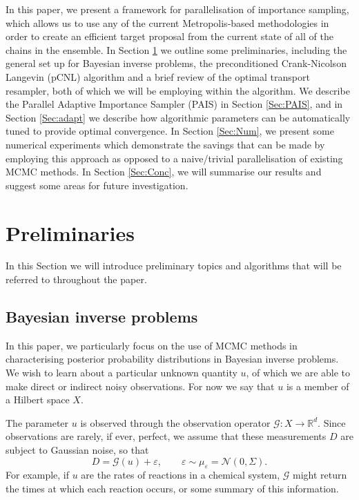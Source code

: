 \documentclass[final]{siamltex}
\newcommand{\G}{\mathcal{G}}
\newcommand{\data}{D}
\begin{document}
In this paper, we present a framework for parallelisation of
importance sampling, which allows us to use any of the current
Metropolis-based methodologies in order to create an efficient target
proposal from the current state of all of the chains in the
ensemble. In Section \ref{Sec:Prelim} we outline some preliminaries,
including the general set up for Bayesian inverse problems, the
preconditioned Crank-Nicolson Langevin (pCNL) algorithm and a
brief review of the optimal transport resampler,  both of which we will be
employing within the algorithm. We describe the Parallel Adaptive
Importance Sampler (PAIS) in Section \ref{Sec:PAIS}, and in Section
\ref{Sec:adapt} we describe how algorithmic parameters can be
automatically tuned to provide optimal convergence. In
Section \ref{Sec:Num}, we present some numerical experiments which
demonstrate the savings that can be made by employing this approach as
opposed to a naive/trivial parallelisation of existing MCMC
methods. In Section \ref{Sec:Conc}, we will summarise our results and
suggest some areas for future investigation.










\section{Preliminaries}\label{Sec:Prelim}
In this Section we will introduce preliminary topics and algorithms
that will be referred to throughout the paper.
\subsection{Bayesian inverse problems}
In this paper, we particularly focus on the use of MCMC methods in characterising
posterior probability distributions in Bayesian inverse problems. We
wish to learn about a particular unknown quantity $u$, of which we are
able to make direct or indirect noisy observations. For now
we say that $u$ is a member of a Hilbert
space $X$. 

The parameter $u$ is observed
through the observation operator $\mathcal{G}:X \to
\mathbb{R}^d$. Since observations are rarely, if ever, perfect, we
assume that these measurements $\data$ are subject to Gaussian noise, so that
\begin{equation}\label{eqn:obs}
	\data = \mathcal{G}(u) + \varepsilon, \qquad \varepsilon \sim \mu_{\varepsilon} = \mathcal{N}(0,\Sigma).
\end{equation}
For example, if $u$ are the rates of reactions in a chemical system, $\G$ might return the times at which each reaction occurs, or some summary of this information.
\end{document}
